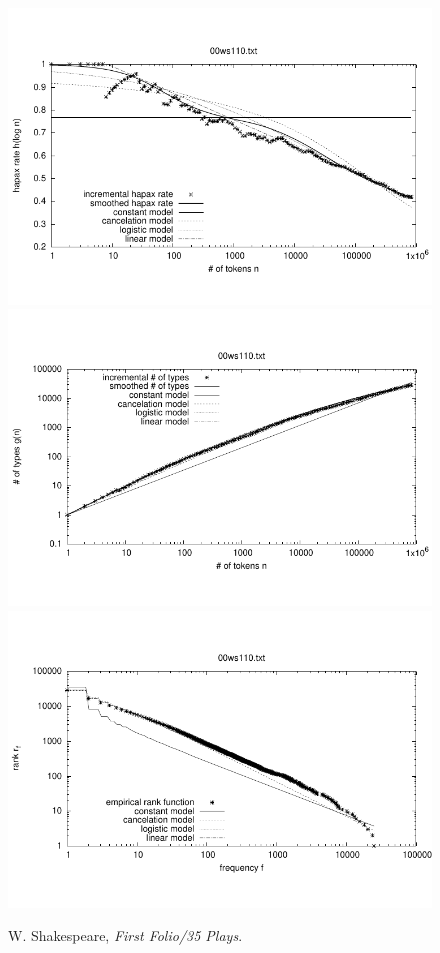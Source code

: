 \documentclass[a4paper,12pt]{article}
\begin{document}
\begin{figure}[p]
  \centering
  \vspace{-2em}
  \includegraphics[width=0.8\columnwidth]{output/herdan/00ws110_27/token_ratio.pdf}
  \\[-3em]
  \includegraphics[width=0.8\columnwidth]{output/herdan/00ws110_27/token_type.pdf}
  \\[-3em]
  \includegraphics[width=0.8\columnwidth]{output/herdan/00ws110_27/frequency_rank.pdf}
  \vspace{-2em}
  \caption{W. Shakespeare, \emph{First Folio/35 Plays}.\label{fig00ws110F}}
\end{figure}
\end{document}
